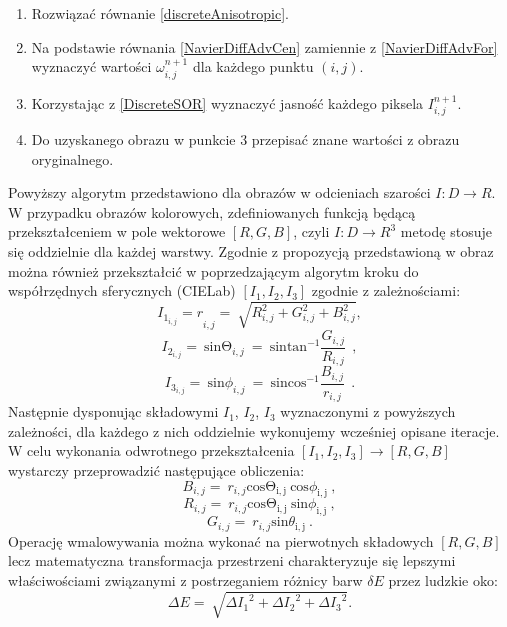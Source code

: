 \documentclass[12pt, twoside, openany]{report}
\theoremstyle{definition}
\begin{document}
\begin{enumerate}
\item
Rozwiązać równanie \eqref{discreteAnisotropic}.
\item
Na podstawie równania \eqref{NavierDiffAdvCen} zamiennie z \eqref{NavierDiffAdvFor} wyznaczyć wartości $\omega_{i,j}^{n+1}$ dla każdego punktu $(i,j)$.
\item
Korzystając z \eqref{DiscreteSOR} wyznaczyć jasność każdego piksela $I_{i,j}^{n+1}$.
\item
Do uzyskanego obrazu w punkcie 3 przepisać znane wartości z obrazu oryginalnego.
\end{enumerate}
Powyższy algorytm przedstawiono dla obrazów w odcieniach szarości $I:D\to R$. W przypadku obrazów kolorowych, zdefiniowanych funkcją będącą przekształceniem w pole wektorowe $[R,G,B]$, czyli $I:D\to R^3$ metodę stosuje się oddzielnie dla każdej warstwy. Zgodnie z propozycją przedstawioną w \cite{fishelov2006image} obraz można również przekształcić w poprzedzającym algorytm kroku do współrzędnych sferycznych (CIELab) $\left[I_{1},I_{2},I_{3} \right]$ zgodnie z zależnościami:
\begin{equation}
{I_{1_{i,j}}=r}_{i,j}=\ \sqrt{R^2_{i,j}+G^2_{i,j}+B^2_{i,j}}
\label{TIone}
,
\end{equation}
\begin{equation}
I_{2_{i,j}}=\ {\mathrm{sin} {\mathrm{\Theta }}_{i,j}\ }=\ {\mathrm{sin} {{\mathrm{tan}}^{-1} \frac{G_{i,j}}{R_{i,j}}\ }\ } 
\label{TItwo}
,
\end{equation}
\begin{equation}
I_{3_{i,j}}=\ {\mathrm{sin} {\phi }_{i,j}\ }=\ {\mathrm{sin} {{\mathrm{cos}}^{-1} \frac{B_{i,j}}{r_{i,j}}\ }\ } 
\label{TIthree}
.
\end{equation}
Następnie dysponując składowymi $I_1$, $I_2$, $I_3$ wyznaczonymi z powyższych zależności, dla każdego z nich oddzielnie wykonujemy wcześniej opisane iteracje. W celu wykonania odwrotnego przekształcenia $\left[I_1,I_2,I_3 \right]\to\left[R,G,B\right]$ wystarczy przeprowadzić następujące obliczenia:
\begin{equation}
 B_{i,j}=\ r_{i,j}{\mathrm{cos} {\mathrm{\Theta }}_{\mathrm{i,j}}\ }{\mathrm{cos} {\phi }_{\mathrm{i,j}}\ }
\label{TInvIone}
,
\end{equation}
\begin{equation}
R_{i,j}=\ r_{i,j}{\mathrm{cos} {\mathrm{\Theta }}_{\mathrm{i,j}}\ }{\mathrm{sin} {\phi }_{\mathrm{i,j}}\ }
\label{TInvItwo},
\end{equation}
\begin{equation}
G_{i,j}=\ r_{i,j}{\mathrm{sin} {\theta }_{\mathrm{i,j}}\ } 
\label{TInvIthree}
.
\end{equation}
Operację wmalowywania można wykonać na pierwotnych składowych $[R,G,B]$ lecz matematyczna transformacja przestrzeni charakteryzuje się lepszymi właściwościami związanymi z postrzeganiem różnicy barw $\delta E$ przez ludzkie oko:
\begin{equation}
\Delta E=\ \sqrt{{\Delta I_1}^2+{\Delta I_2}^2+{\Delta I_3}^2}
\label{deltaE}
.
\end{equation}
\end{document}
